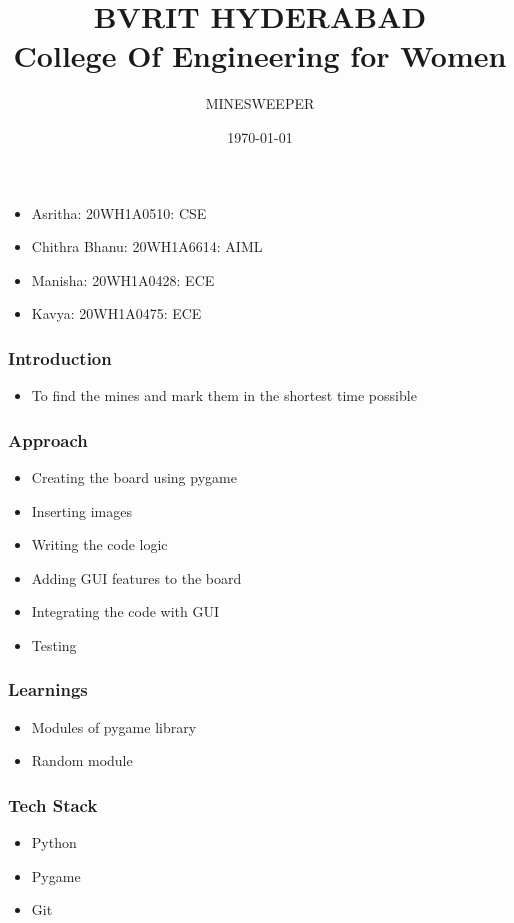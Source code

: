 \documentclass[14pt]{beamer}
\title{BVRIT HYDERABAD\\ College Of Engineering for Women}
\author{MINESWEEPER}
\date{\today}
\begin{document}
    \begin{frame}
        \titlepage
    \end{frame}
	\begin{frame}
		\begin{itemize}
			\frametitle{Team Number: 12}
			\item {Asritha: 20WH1A0510: CSE}
			\item {Chithra Bhanu: 20WH1A6614: AIML}
			\item {Manisha: 20WH1A0428: ECE}
			\item {Kavya: 20WH1A0475: ECE}
		\end{itemize}
	\end{frame}
    \begin{frame}
	\frametitle{Introduction}
        \begin{itemize}
	    \item To find the mines and mark them in the shortest time possible
	\end{itemize}
    \end{frame}
    \begin{frame}
	\frametitle{Approach}
	\begin{itemize}
	    \item Creating the board using pygame\\
        \item Inserting images\\
        \item Writing the code logic 
	    \item Adding GUI features to the board \\
	    \item Integrating the code with GUI
	    \item Testing

	\end{itemize}
    \end{frame}
    \begin{frame}
        \frametitle{Learnings}
	\begin{itemize}
	    \item Modules of pygame library
	    \item Random module 
	\end{itemize}
    \end{frame}
    \begin{frame}
        \frametitle{Tech Stack}
	\begin{itemize}
	    \item Python 
	    \item Pygame
	    \item Git
	\end{itemize}
    \end{frame}
\end{document}

